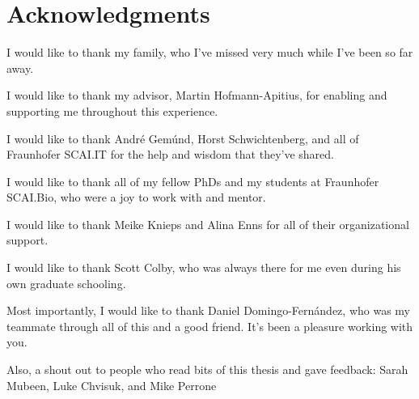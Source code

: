 \chapter*{Acknowledgments}

I would like to thank my family, who I've missed very much while I've been so far away.

I would like to thank my advisor, Martin Hofmann-Apitius, for enabling and supporting me throughout this experience.

I would like to thank Andr\'e Gem\'und, Horst Schwichtenberg, and all of Fraunhofer SCAI.IT for the help and wisdom that they've shared.

I would like to thank all of my fellow PhDs and my students at Fraunhofer SCAI.Bio, who were a joy to work with and mentor.

I would like to thank Meike Knieps and Alina Enns for all of their organizational support.

I would like to thank Scott Colby, who was always there for me even during his own graduate schooling.

Most importantly, I would like to thank Daniel Domingo-Fern\'{a}ndez, who was my teammate through all of this and a good friend.
It's been a pleasure working with you.

\vspace*{\fill}

Also, a shout out to people who read bits of this thesis and gave feedback: Sarah Mubeen, Luke Chvisuk, and Mike Perrone
